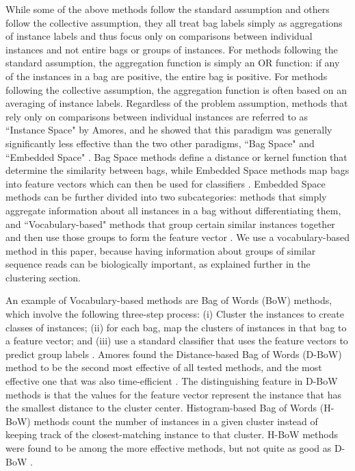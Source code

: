 While some of the above methods follow the standard assumption and others follow the collective assumption, they all treat bag labels simply as aggregations of instance labels and thus focus only on comparisons between individual instances and not entire bags or groups of instances. For methods following the standard assumption, the aggregation function is simply an OR function: if any of the instances in a bag are positive, the entire bag is positive. For methods following the collective assumption, the aggregation function is often based on an averaging of instance labels. Regardless of the problem assumption, methods that rely only on comparisons between individual instances are referred to as ``Instance Space" by Amores, and he showed that this paradigm was generally significantly less effective than the two other paradigms, ``Bag Space" and ``Embedded Space" \cite{amores13}. Bag Space methods define a distance or kernel function that determine the similarity between bags, while Embedded Space methods map bags into feature vectors which can then be used for classifiers \cite{amores13}. Embedded Space methods can be further divided into two subcategories: methods that simply aggregate information about all instances in a bag without differentiating them, and ``Vocabulary-based" methods that group certain similar instances together and then use those groups to form the feature vector \cite{amores13}. We use a vocabulary-based method in this paper, because having information about groups of similar sequence reads can be biologically important, as explained further in the clustering section.

An example of Vocabulary-based methods are Bag of Words (BoW) methods, which involve the following three-step process: (i) Cluster the instances to create classes of instances; (ii) for each bag, map the clusters of instances in that bag to a feature vector; and (iii) use a standard classifier that uses the feature vectors to predict group labels \cite{amores13}. Amores found the Distance-based Bag of Words (D-BoW) method to be the second most effective of all tested methods, and the most effective one that was also time-efficient \cite{amores13}. The distinguishing feature in D-BoW methods is that the values for the feature vector represent the instance that has the smallest distance to the cluster center. Histogram-based Bag of Words (H-BoW) methods count the number of instances in a given cluster instead of keeping track of the closest-matching instance to that cluster. H-BoW methods were found to be among the more effective methods, but not quite as good as D-BoW \cite{amores13}. 

